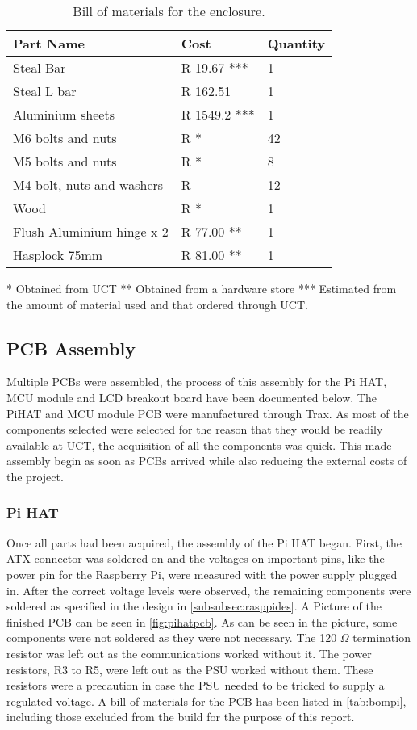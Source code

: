 \documentclass[a4paper,11pt]{article}
\numberwithin{figure}{section}
\numberwithin{table}{section}
\begin{document}
	\begin{table}[ht]
	\centering		
	\begin{tabular}{| m{8cm} | m{4cm}| m{3cm} |}
	\hline
	\textbf{Part Name} & \textbf{Cost} & \textbf{Quantity} \\
	\hline
	Steal Bar & R 19.67 *** & 1 \\
	\hline
	Steal L bar & R 162.51 & 1 \\
	\hline	
	Aluminium sheets & R 1549.2 *** & 1 \\
	\hline	
	M6 bolts and nuts & R * & 42 \\
	\hline
	M5 bolts and nuts & R * & 8 \\
	\hline
	M4 bolt, nuts and washers & R & 12\\	
	\hline
	Wood & R * & 1\\
	\hline	
	Flush Aluminium hinge x 2 & R 77.00 ** & 1 \\
	\hline
	Hasplock 75mm & R 81.00 ** & 1 \\
	\hline
	\end{tabular}
	
	 * Obtained from UCT
	 ** Obtained from a hardware store
	 *** Estimated from the amount of material used and that ordered through UCT.
	\caption{Bill of materials for the enclosure. \label{tab:bomen}}
	\end{table}	

\subsection{PCB Assembly}
Multiple PCBs were assembled, the process of this assembly for the Pi HAT, MCU module and LCD breakout board have been documented below. The PiHAT and MCU module PCB were manufactured through Trax. As most of the components selected were selected for the reason that they would be readily available at UCT, the acquisition of all the components was quick. This made assembly begin as soon as PCBs arrived while also reducing the external costs of the project.

\subsubsection{Pi HAT}

Once all parts had been acquired, the assembly of the Pi HAT began. First, the ATX connector was soldered on and the voltages on important pins, like the power pin for the Raspberry Pi, were measured with the power supply plugged in. After the correct voltage levels were observed, the remaining components were soldered as specified in the design in \autoref{subsubsec:rasppides}. A Picture of the finished PCB can be seen in \autoref{fig:pihatpcb}. As can be seen in the picture, some components were not soldered as they were not necessary. The 120 $\Omega$ termination resistor was left out as the communications worked without it. The power resistors, R3 to R5, were left out as the PSU worked without them. These resistors were a precaution in case the PSU needed to be tricked to supply a regulated voltage. A bill of materials for the PCB has been listed in \autoref{tab:bompi}, including those excluded from the build for the purpose of this report.
	
\end{document}
